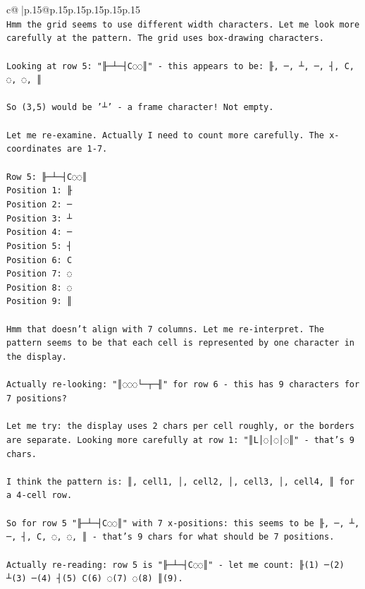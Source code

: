 \documentclass{article}
\begin{document}
{\begin{supertabular}{c@{$\;$}|p{.15\linewidth}@{}p{.15\linewidth}p{.15\linewidth}p{.15\linewidth}p{.15\linewidth}p{.15\linewidth}}
{{{\\ 
\texttt{Hmm the grid seems to use different width characters. Let me look more carefully at the pattern. The grid uses box{-}drawing characters.} \\
\\ 
\texttt{Looking at row 5: "╟─┴─┤C◌◌║" {-} this appears to be: ╟, ─, ┴, ─, ┤, C, ◌, ◌, ║} \\
\\ 
\texttt{So (3,5) would be '┴' {-} a frame character! Not empty.} \\
\\ 
\texttt{Let me re{-}examine. Actually I need to count more carefully. The x{-}coordinates are 1{-}7.} \\
\\ 
\texttt{Row 5: ╟─┴─┤C◌◌║} \\
\texttt{Position 1: ╟} \\
\texttt{Position 2: ─} \\
\texttt{Position 3: ┴} \\
\texttt{Position 4: ─} \\
\texttt{Position 5: ┤} \\
\texttt{Position 6: C} \\
\texttt{Position 7: ◌} \\
\texttt{Position 8: ◌} \\
\texttt{Position 9: ║} \\
\\ 
\texttt{Hmm that doesn't align with 7 columns. Let me re{-}interpret. The pattern seems to be that each cell is represented by one character in the display.} \\
\\ 
\texttt{Actually re{-}looking: "║◌◌◌└─┬─╢" for row 6 {-} this has 9 characters for 7 positions? } \\
\\ 
\texttt{Let me try: the display uses 2 chars per cell roughly, or the borders are separate. Looking more carefully at row 1: "║L│◌│◌│◌║" {-} that's 9 chars.} \\
\\ 
\texttt{I think the pattern is: ║, cell1, │, cell2, │, cell3, │, cell4, ║ for a 4{-}cell row.} \\
\\ 
\texttt{So for row 5 "╟─┴─┤C◌◌║" with 7 x{-}positions: this seems to be ╟, ─, ┴, ─, ┤, C, ◌, ◌, ║ {-} that's 9 chars for what should be 7 positions.} \\
\\ 
\texttt{Actually re{-}reading: row 5 is "╟─┴─┤C◌◌║" {-} let me count: ╟(1) ─(2) ┴(3) ─(4) ┤(5) C(6) ◌(7) ◌(8) ║(9). } \\
}}}
\end{supertabular}}
\end{document}
